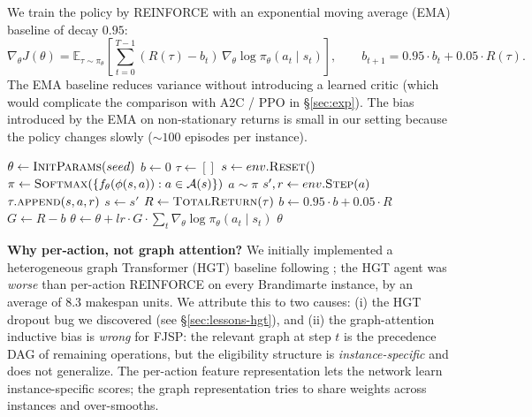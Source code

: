 \documentclass[10pt]{article}
\theoremstyle{definition}
\newcommand{\E}{\mathbb{E}}
\begin{document}
We train the policy by REINFORCE \citep{Williams1992}
with an exponential moving average (EMA) baseline of
decay $0.95$:
\begin{equation}
  \nabla_\theta J(\theta) =
  \E_{\tau \sim \pi_\theta}\!\left[
  \sum_{t=0}^{T-1} (R(\tau) - b_t) \,
  \nabla_\theta \log \pi_\theta(a_t \mid s_t)
  \right],
  \qquad
  b_{t+1} = 0.95 \cdot b_t + 0.05 \cdot R(\tau).
  \label{eq:reinforce-ema}
\end{equation}
The EMA baseline reduces variance without introducing a
learned critic (which would complicate the comparison
with A2C / PPO in \S\ref{sec:exp}). The bias introduced
by the EMA on non-stationary returns is small in our
setting because the policy changes slowly
($\sim\!100$ episodes per instance).

\begin{algorithm}[t]
\caption{Per-Action REINFORCE with EMA Baseline}
\label{alg:reinforce}
\begin{algorithmic}[1]
  \State $\theta \gets \textsc{InitParams}(seed)$
  \State $b \gets 0$  
    \State $\tau \gets []$  
    \State $s \gets env.\textsc{Reset}()$
      \State $\pi \gets \textsc{Softmax}(\{f_\theta(\phi(s,a)) : a \in \mathcal{A}(s)\})$
      \State $a \sim \pi$
      \State $s', r \gets env.\textsc{Step}(a)$
      \State $\tau.\textsc{append}(s, a, r)$
      \State $s \gets s'$
    \EndWhile
    \State $R \gets \textsc{TotalReturn}(\tau)$
    \State $b \gets 0.95 \cdot b + 0.05 \cdot R$
    \State $G \gets R - b$  
    \State $\theta \gets \theta + lr \cdot G \cdot
           \sum_t \nabla_\theta \log \pi_\theta(a_t \mid s_t)$
  \EndFor
  \State \Return $\theta$
\EndFunction
\end{algorithmic}
\end{algorithm}

\textbf{Why per-action, not graph attention?}
We initially implemented a heterogeneous graph
Transformer (HGT) baseline following \citet{Hu2020HGT};
the HGT agent was \emph{worse} than per-action REINFORCE
on every Brandimarte instance, by an average of
$8.3$ makespan units. We
attribute this to two causes: (i) the HGT dropout bug we
discovered (see \S\ref{sec:lessons-hgt}), and (ii) the
graph-attention inductive bias is \emph{wrong} for FJSP:
the relevant graph at step $t$ is the precedence DAG of
remaining operations, but the eligibility structure is
\emph{instance-specific} and does not generalize. The
per-action feature representation lets the network learn
instance-specific scores; the graph representation tries to
share weights across instances and over-smooths.
\end{document}
